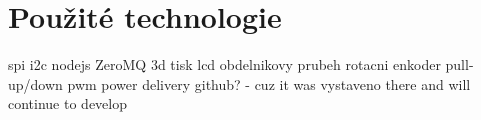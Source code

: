\chapter{Použité technologie}
spi
i2c
nodejs
ZeroMQ
3d tisk
lcd
obdelnikovy prubeh
rotacni enkoder
pull-up/down
pwm
power delivery
github? - cuz it was vystaveno there and will continue to develop